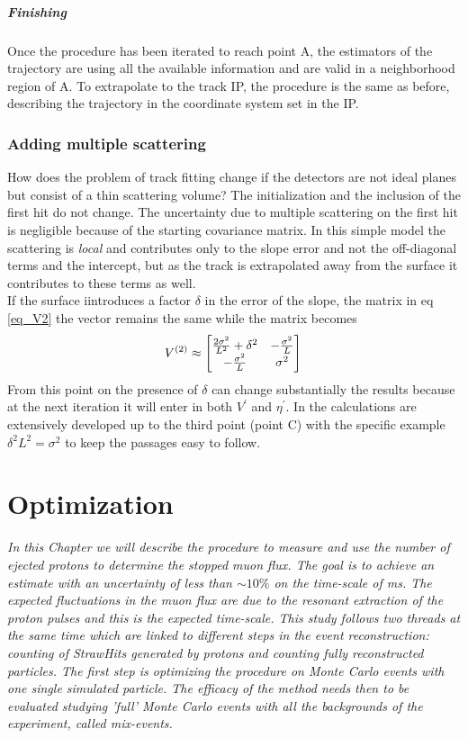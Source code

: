 \documentclass[12pt,a4paper,openright, oneside, titlepage]{book} %
\begin{document}
\paragraph{Finishing} Once the procedure has been iterated  to reach point A, 
the estimators of the trajectory are using all the available information and are valid in a neighborhood region of A. 
To extrapolate to the track IP, 
the procedure is the same as before, 
describing the trajectory in the coordinate system set in the IP. 

\subsection*{Adding multiple scattering}
How does the problem of track fitting change if the detectors are not ideal planes but consist of a thin scattering volume? 
The initialization and the inclusion of the first hit do not change. 
The uncertainty due to multiple scattering on the first hit is negligible because of the starting covariance matrix. 
In this simple model the scattering is \textit{local} and contributes only to the slope error and not the off-diagonal terms 
and the intercept, but as the track is extrapolated away from the surface it contributes to these terms as well.\\
If the surface iintroduces a factor $\delta$ in the error of the slope, 
the matrix in eq \ref{eq_V2} the vector remains the same while the matrix becomes
$$
V^{(2)}\approx
\begin{bmatrix}
\frac{2\sigma^2}{L^2}+\delta^2 & -\frac{\sigma^2}{L} \\
-\frac{\sigma^2}{L} & \sigma^2
\end{bmatrix}\\
$$
From this point on the presence of $\delta$ can change substantially the results because at the next iteration it will enter in both $V^\prime$ and $\eta^\prime$.
 In \cite{KutschkePaper} the calculations are extensively developed up to the third point (point C) 
 with the specific example $\delta^2L^2=\sigma^2$ to keep the passages easy to follow.

\chapter{Optimization}
{\itshape In this Chapter we will describe the procedure to measure and use the number of ejected protons to determine the stopped muon flux. 
The goal is to achieve an estimate with an uncertainty of less than $\sim10\%$ on the time-scale of ms. 
The expected fluctuations in the muon flux are due to the resonant extraction of the proton pulses and this is the expected time-scale. 
This study follows two threads at the same time which are linked to different steps in the event reconstruction: counting of StrawHits generated by protons and counting fully reconstructed particles. 
The first step is optimizing the procedure on Monte Carlo events with one single simulated particle. 
The efficacy of the method needs then to be evaluated studying 'full' Monte Carlo events with all the backgrounds of the experiment, called \textit{mix-events}.}
\end{document}
